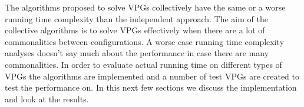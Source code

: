 The algorithms proposed to solve VPGs collectively have the same or a worse running time complexity than the independent approach. The aim of the collective algorithms is to solve VPGs effectively when there are a lot of commonalities between configurations. A worse case running time complexity analyses doesn't say much about the performance in case there are many commonalities. In order to evaluate actual running time on different types of VPGs the algorithms are implemented and a number of test VPGs are created to test the performance on. In this next few sections we discuss the implementation and look at the results.